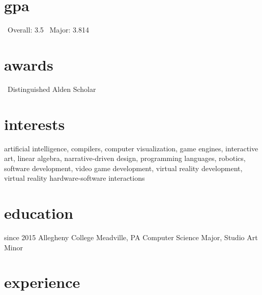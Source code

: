 \documentclass[]{friggeri-cv}
\begin{document}
\begin{aside}
  \section{gpa}
  	\bullet\ Overall: 3.5\vspace{0.1cm}
  	\bullet\ Major: 3.814\vspace{0.1cm}
  \section{awards}
    \bullet\ Distinguished Alden Scholar\vspace{0.1cm}
\end{aside}

\section{interests}

artificial intelligence, compilers, computer visualization, game engines, interactive art, linear algebra, narrative-driven design, programming languages, robotics, software development, video game development, virtual reality development, virtual reality hardware-software interactions

\section{education}
\begin{entrylist}
  \entry
    {since 2015}
    {Allegheny College}
    {Meadville, PA}
    {Computer Science Major, Studio Art Minor}
\end{entrylist}

\section{experience}
\end{document}
